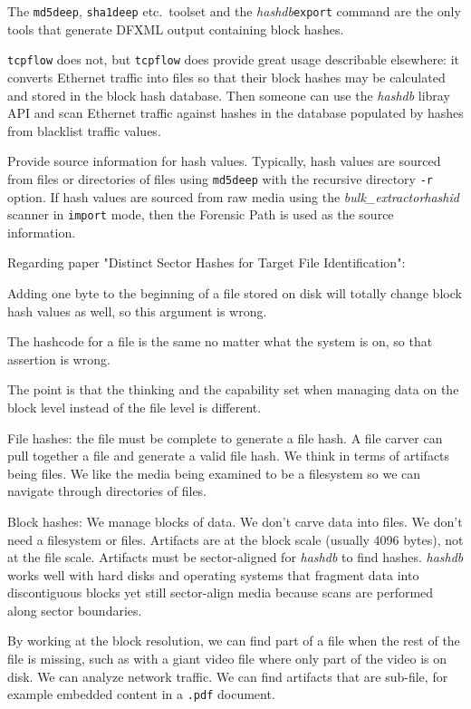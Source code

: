 \documentclass[12pt,twoside]{article}
\newcommand{\hdb}{\emph{hashdb}\xspace}
\newcommand{\bulk}{\emph{bulk\_extractor}\xspace}
\newcommand{\hid}{\emph{hashid}\xspace}
\begin{document}
The \texttt{md5deep}, \texttt{sha1deep} etc.\ toolset
and the \hdb \texttt{export} command
are the only tools that generate DFXML output containing block hashes.

\texttt{tcpflow} does not, but \texttt{tcpflow} does provide
great usage describable elsewhere: it converts Ethernet traffic
into files so that their block hashes may be calculated
and stored in the block hash database.
Then someone can use the \hdb libray API and scan Ethernet traffic
against hashes in the database populated by hashes
from blacklist traffic values.

Provide source information for hash values.
Typically, hash values are sourced from files or directories of files
using \texttt{md5deep} with the recursive directory \texttt{-r} option.
If hash values are sourced from raw media using the \bulk \hid scanner
in \texttt{import} mode, then the Forensic Path is used
as the source information.

Regarding paper "Distinct Sector Hashes for Target File Identification":

Adding one byte to the beginning of a file stored on disk will
totally change block hash values as well,
so this argument is wrong.

The hashcode for a file is the same no matter what the system is on,
so that assertion is wrong.

The point is that the thinking and the capability set
when managing data on the block level instead of the file level is different.

File hashes: the file must be complete to generate a file hash.
A file carver can pull together a file and generate a valid file hash.
We think in terms of artifacts being files.
We like the media being examined to be a filesystem
so we can navigate through directories of files.

Block hashes:
We manage blocks of data.
We don't carve data into files.
We don't need a filesystem or files.
Artifacts are at the block scale (usually 4096 bytes), not at the file scale.
Artifacts must be sector-aligned for \hdb to find hashes.
\hdb works well with hard disks and operating systems that fragment
data into discontiguous blocks yet still sector-align media
because scans are performed along sector boundaries.

By working at the block resolution, we can find part of a file when
the rest of the file is missing, such as with a giant video file
where only part of the video is on disk.
We can analyze network traffic.
We can find artifacts that are sub-file, for example embedded content
in a \texttt{.pdf} document.
\end{document}
